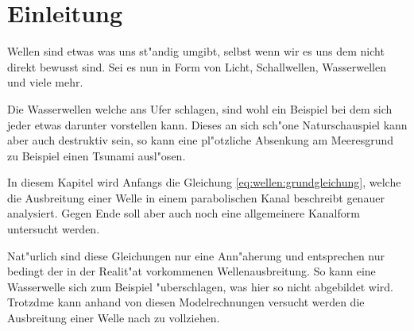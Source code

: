 \section{Einleitung}
Wellen sind etwas was uns st"andig umgibt, selbst wenn wir es uns dem nicht 
direkt bewusst sind. Sei es nun in Form von Licht, Schallwellen, Wasserwellen 
und viele mehr.

Die Wasserwellen welche ans Ufer schlagen, sind wohl ein Beispiel bei dem sich 
jeder etwas darunter vorstellen kann. Dieses an sich sch"one Naturschauspiel 
kann aber auch destruktiv sein, so kann eine pl"otzliche Absenkung am 
Meeresgrund zu Beispiel einen Tsunami ausl"osen.

In diesem Kapitel wird Anfangs die Gleichung \ref{eq:wellen:grundgleichung}, 
welche die Ausbreitung einer Welle in einem parabolischen Kanal beschreibt 
genauer analysiert. Gegen Ende soll aber auch noch eine allgemeinere Kanalform 
untersucht werden.

Nat"urlich sind diese Gleichungen nur eine Ann"aherung und entsprechen nur 
bedingt der in der Realit"at vorkommenen Wellenausbreitung. So kann eine 
Wasserwelle sich zum Beispiel "uberschlagen, was hier so nicht abgebildet wird. 
Trotzdme kann anhand von diesen Modelrechnungen versucht werden die Ausbreitung 
einer Welle nach zu vollziehen.
